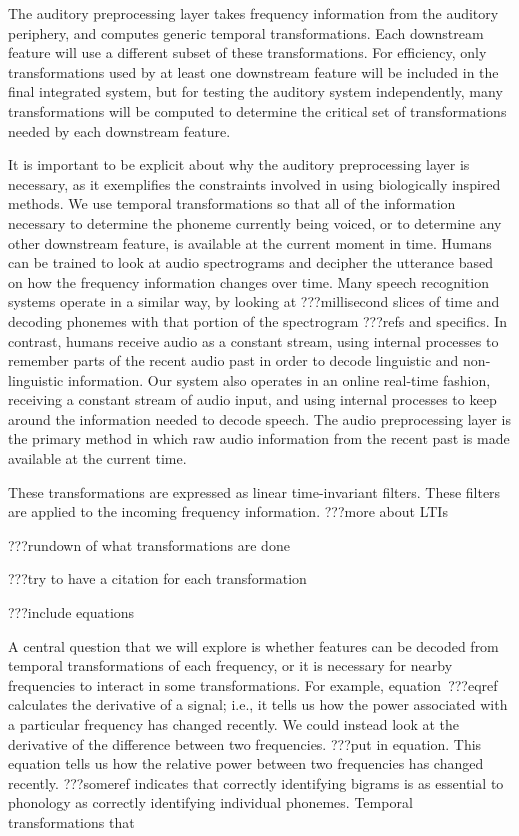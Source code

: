 The auditory preprocessing layer
takes frequency information from the auditory periphery,
and computes generic temporal transformations.
Each downstream feature will use a different
subset of these transformations.
For efficiency,
only transformations used by at least one
downstream feature will be
included in the final integrated system,
but for testing the auditory system independently,
many transformations will be computed
to determine the critical set of
transformations needed by each downstream feature.

It is important to be explicit about
why the auditory preprocessing layer is necessary,
as it exemplifies the constraints involved in
using biologically inspired methods.
We use temporal transformations
so that all of the information necessary
to determine the phoneme currently being voiced,
or to determine any other downstream feature,
is available at the current moment in time.
Humans can be trained to look at
audio spectrograms and decipher
the utterance based on how the
frequency information changes over time.
Many speech recognition systems operate
in a similar way, by looking at
???millisecond slices of time
and decoding phonemes with that portion
of the spectrogram ???refs and specifics.
In contrast, humans receive audio
as a constant stream,
using internal processes to remember
parts of the recent audio past
in order to decode linguistic
and non-linguistic information.
Our system also operates in
an online real-time fashion,
receiving a constant stream of audio input,
and using internal processes
to keep around the information
needed to decode speech.
The audio preprocessing layer
is the primary method in which
raw audio information from the recent past
is made available at the current time.

These transformations are expressed as
linear time-invariant filters.
These filters are applied to the incoming
frequency information.
???more about LTIs

???rundown of what transformations are done

???try to have a citation for each transformation

???include equations

A central question that we will explore
is whether features can be decoded
from temporal transformations
of each frequency,
or it is necessary for nearby frequencies
to interact in some transformations.
For example,
equation~???eqref calculates
the derivative of a signal;
i.e., it tells us how the power associated
with a particular frequency has changed recently.
We could instead look at the derivative
of the difference between two frequencies.
???put in equation.
This equation tells us how the relative
power between two frequencies
has changed recently.
???someref indicates that
correctly identifying bigrams
is as essential to phonology
as correctly identifying individual phonemes.
Temporal transformations that

